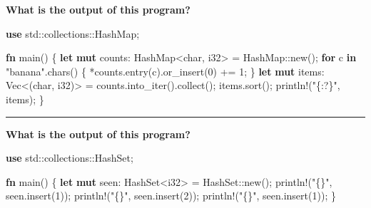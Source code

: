 \documentclass[
  11pt,
]{article}
\newenvironment{Shaded}{}{}
\newcommand{\ControlFlowTok}[1]{\textcolor[rgb]{0.00,0.44,0.13}{\textbf{#1}}}
\newcommand{\DataTypeTok}[1]{\textcolor[rgb]{0.56,0.13,0.00}{#1}}
\newcommand{\DecValTok}[1]{\textcolor[rgb]{0.25,0.63,0.44}{#1}}
\newcommand{\KeywordTok}[1]{\textcolor[rgb]{0.00,0.44,0.13}{\textbf{#1}}}
\newcommand{\NormalTok}[1]{#1}
\newcommand{\OperatorTok}[1]{\textcolor[rgb]{0.40,0.40,0.40}{#1}}
\newcommand{\PreprocessorTok}[1]{\textcolor[rgb]{0.74,0.48,0.00}{#1}}
\newcommand{\StringTok}[1]{\textcolor[rgb]{0.25,0.44,0.63}{#1}}
\begin{document}
\textbf{What is the output of this program?}

\begin{Shaded}
\begin{Highlighting}[]
\KeywordTok{use} \PreprocessorTok{std::collections::}\NormalTok{HashMap}\OperatorTok{;}

\KeywordTok{fn}\NormalTok{ main() }\OperatorTok{\{}
    \KeywordTok{let} \KeywordTok{mut}\NormalTok{ counts}\OperatorTok{:}\NormalTok{ HashMap}\OperatorTok{\textless{}}\DataTypeTok{char}\OperatorTok{,} \DataTypeTok{i32}\OperatorTok{\textgreater{}} \OperatorTok{=} \PreprocessorTok{HashMap::}\NormalTok{new()}\OperatorTok{;}
    \ControlFlowTok{for}\NormalTok{ c }\KeywordTok{in} \StringTok{"banana"}\OperatorTok{.}\NormalTok{chars() }\OperatorTok{\{}
        \OperatorTok{*}\NormalTok{counts}\OperatorTok{.}\NormalTok{entry(c)}\OperatorTok{.}\NormalTok{or\_insert(}\DecValTok{0}\NormalTok{) }\OperatorTok{+=} \DecValTok{1}\OperatorTok{;}
    \OperatorTok{\}}
    \KeywordTok{let} \KeywordTok{mut}\NormalTok{ items}\OperatorTok{:} \DataTypeTok{Vec}\OperatorTok{\textless{}}\NormalTok{(}\DataTypeTok{char}\OperatorTok{,} \DataTypeTok{i32}\NormalTok{)}\OperatorTok{\textgreater{}} \OperatorTok{=}\NormalTok{ counts}\OperatorTok{.}\NormalTok{into\_iter()}\OperatorTok{.}\NormalTok{collect()}\OperatorTok{;}
\NormalTok{    items}\OperatorTok{.}\NormalTok{sort()}\OperatorTok{;}
    \PreprocessorTok{println!}\NormalTok{(}\StringTok{"\{:?\}"}\OperatorTok{,}\NormalTok{ items)}\OperatorTok{;}
\OperatorTok{\}}
\end{Highlighting}
\end{Shaded}

\begin{center}\rule{0.5\linewidth}{0.5pt}\end{center}

\textbf{What is the output of this program?}

\begin{Shaded}
\begin{Highlighting}[]
\KeywordTok{use} \PreprocessorTok{std::collections::}\NormalTok{HashSet}\OperatorTok{;}

\KeywordTok{fn}\NormalTok{ main() }\OperatorTok{\{}
    \KeywordTok{let} \KeywordTok{mut}\NormalTok{ seen}\OperatorTok{:}\NormalTok{ HashSet}\OperatorTok{\textless{}}\DataTypeTok{i32}\OperatorTok{\textgreater{}} \OperatorTok{=} \PreprocessorTok{HashSet::}\NormalTok{new()}\OperatorTok{;}
    \PreprocessorTok{println!}\NormalTok{(}\StringTok{"\{\}"}\OperatorTok{,}\NormalTok{ seen}\OperatorTok{.}\NormalTok{insert(}\DecValTok{1}\NormalTok{))}\OperatorTok{;}
    \PreprocessorTok{println!}\NormalTok{(}\StringTok{"\{\}"}\OperatorTok{,}\NormalTok{ seen}\OperatorTok{.}\NormalTok{insert(}\DecValTok{2}\NormalTok{))}\OperatorTok{;}
    \PreprocessorTok{println!}\NormalTok{(}\StringTok{"\{\}"}\OperatorTok{,}\NormalTok{ seen}\OperatorTok{.}\NormalTok{insert(}\DecValTok{1}\NormalTok{))}\OperatorTok{;}
\OperatorTok{\}}
\end{Highlighting}
\end{Shaded}
\end{document}
